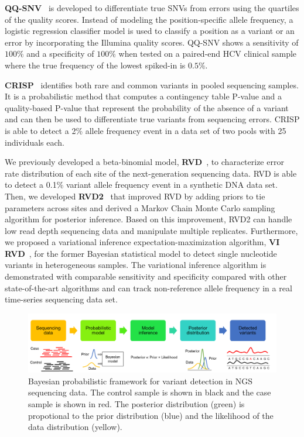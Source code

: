 \documentclass[a4,center,fleqn]{NAR}
\begin{document}
\textbf{QQ-SNV}~\citep{VanderBorght2015} is developed to differentiate true SNVs from errors using the quartiles of the quality scores.
Instead of modeling the position-specific allele frequency, a logistic regression classifier model is used to classify a position as a variant or an error by incorporating the Illumina quality scores.
QQ-SNV shows a sensitivity of $100\%$ and a specificity of $100\%$ when tested on a paired-end HCV clinical sample where the true frequency of the lowest spiked-in is $0.5\%$.


\textbf{CRISP}~\citep{Bansal2010} identifies both rare and common variants in pooled sequencing samples.
It is a probabilistic method that computes a contingency table P-value and a quality-based P-value that represent the probability of the absence of a variant and can then be used to differentiate true variants from sequencing errors.
CRISP is able to detect a 2\% allele frequency event in a data set of two pools with 25 individuals each.


We previously developed a beta-binomial model, \textbf{RVD}~\citep{Flaherty2012}, to characterize error rate distribution of each site of the next-generation sequencing data.
RVD is able to detect a 0.1\% variant allele frequency event in a synthetic DNA data set.
Then, we developed \textbf{RVD2}~\citep{He2015} that improved RVD by adding priors to tie parameters across sites and derived a Markov Chain Monte Carlo sampling algorithm for posterior inference.
Based on this improvement, RVD2 can handle low read depth sequencing data and manipulate multiple replicates.
Furthermore, we proposed a variational inference expectation-maximization algorithm, \textbf{VI RVD}~\citep{zhang2016variational}, for the former Bayesian statistical model to detect single nucleotide variants in heterogeneous samples.
The variational inference algorithm is demonstrated with comparable sensitivity and specificity compared with other state-of-the-art algorithms and can track non-reference allele frequency in a real time-series sequencing data set.



\begin{figure}[htp]
\centering
\includegraphics[width=1\textwidth]{bayesian.png}
\caption{Bayesian probabilistic framework for variant detection in NGS sequencing data.
The control sample is shown in black and the case sample is shown in red.
The posterior distribution (green) is propotional to the prior distribution (blue) and the likelihood of the data distribution (yellow).}
\label{fig:Bayesian}
\end{figure}
\end{document}
